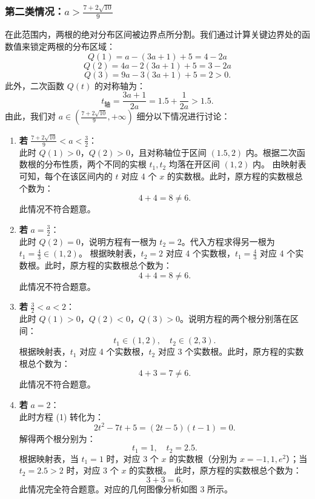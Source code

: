 \documentclass[11pt,a4paper]{ctexart}
\begin{document}
\subsubsection{第二类情况：\(a > \frac{7+2\sqrt{10}}{9}\)}

在此范围内，两根的绝对分布区间被边界点所分割。我们通过计算关键边界处的函数值来锁定两根的分布区域：
\[
Q(1) = a - (3a+1) + 5 = 4 - 2a
\]
\[
Q(2) = 4a - 2(3a+1) + 5 = 3 - 2a
\]
\[
Q(3) = 9a - 3(3a+1) + 5 = 2 > 0.
\]
此外，二次函数 \(Q(t)\) 的对称轴为：
\[
t_{\text{轴}} = \frac{3a+1}{2a} = 1.5 + \frac{1}{2a} > 1.5.
\]
由此，我们对 \(a \in \left( \frac{7+2\sqrt{10}}{9}, +\infty \right)\) 细分以下情况进行讨论：

\begin{enumerate}[label=(\roman*)]
  \item \textbf{若 } \(\frac{7+2\sqrt{10}}{9} < a < \frac{3}{2}\)：\\
    此时 \(Q(1) > 0\)，\(Q(2) > 0\)，且对称轴位于区间 \((1.5, 2)\) 内。根据二次函数根的分布性质，两个不同的实根 \(t_1, t_2\) 均落在开区间 \((1, 2)\) 内。
    由映射表可知，每个在该区间内的 \(t\) 对应 4 个 \(x\) 的实数根。此时，原方程的实数根总个数为：
    \[
    4 + 4 = 8 \neq 6.
    \]
    此情况不符合题意。

  \item \textbf{若 } \(a = \frac{3}{2}\)：\\
    此时 \(Q(2) = 0\)，说明方程有一根为 \(t_2 = 2\)。代入方程求得另一根为 \(t_1 = \frac{4}{3} \in (1, 2)\)。
    根据映射表，\(t_2 = 2\) 对应 4 个实数根，\(t_1 = \frac{4}{3}\) 对应 4 个实数根。此时，原方程的实数根总个数为：
    \[
    4 + 4 = 8 \neq 6.
    \]
    此情况不符合题意。

  \item \textbf{若 } \(\frac{3}{2} < a < 2\)：\\
    此时 \(Q(1) > 0\)，\(Q(2) < 0\)，\(Q(3) > 0\)。说明方程的两个根分别落在区间：
    \[
    t_1 \in (1, 2), \quad t_2 \in (2, 3).
    \]
    根据映射表，\(t_1\) 对应 4 个实数根，\(t_2\) 对应 3 个实数根。此时，原方程的实数根总个数为：
    \[
    4 + 3 = 7 \neq 6.
    \]
    此情况不符合题意。

  \item \textbf{若 } \(a = 2\)：\\
    此时方程 (1) 转化为：
    \[
    2t^2 - 7t + 5 = (2t-5)(t-1) = 0.
    \]
    解得两个根分别为：
    \[
    t_1 = 1, \quad t_2 = 2.5.
    \]
    根据映射表，当 \(t_1 = 1\) 时，对应 3 个 \(x\) 的实数根（分别为 \(x = -1, 1, e^2\)）；当 \(t_2 = 2.5 > 2\) 时，对应 3 个 \(x\) 的实数根。
    此时，原方程的实数根总个数为：
    \[
    3 + 3 = 6.
    \]
    此情况完全符合题意。对应的几何图像分析如图 3 所示。


\end{enumerate}
\end{document}
